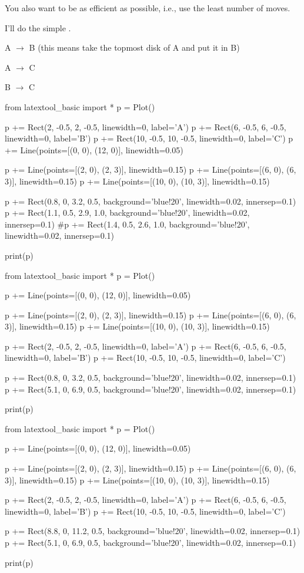  You also want to be as efficient as possible, i.e., use the least number
 of moves.

 I'll do the simple .

 A $\rightarrow$ B (this means take the topmost disk of A and put it in B)

 A $\rightarrow$ C

 B $\rightarrow$ C

\begin{python}
from latextool_basic import *
p = Plot()

p += Rect(2, -0.5, 2, -0.5, linewidth=0, label='A')
p += Rect(6, -0.5, 6, -0.5, linewidth=0, label='B')
p += Rect(10, -0.5, 10, -0.5, linewidth=0, label='C')
p += Line(points=[(0, 0), (12, 0)], linewidth=0.05)

p += Line(points=[(2, 0), (2, 3)], linewidth=0.15)
p += Line(points=[(6, 0), (6, 3)], linewidth=0.15)
p += Line(points=[(10, 0), (10, 3)], linewidth=0.15)

p += Rect(0.8, 0, 3.2, 0.5, background='blue!20', linewidth=0.02, innersep=0.1)  
p += Rect(1.1, 0.5, 2.9, 1.0, background='blue!20', linewidth=0.02, innersep=0.1)
#p += Rect(1.4, 0.5, 2.6, 1.0, background='blue!20', linewidth=0.02, innersep=0.1)

print(p)
\end{python}

\begin{python}
from latextool_basic import *
p = Plot()

p += Line(points=[(0, 0), (12, 0)], linewidth=0.05)

p += Line(points=[(2, 0), (2, 3)], linewidth=0.15)
p += Line(points=[(6, 0), (6, 3)], linewidth=0.15)
p += Line(points=[(10, 0), (10, 3)], linewidth=0.15)

p += Rect(2, -0.5, 2, -0.5, linewidth=0, label='A')
p += Rect(6, -0.5, 6, -0.5, linewidth=0, label='B')
p += Rect(10, -0.5, 10, -0.5, linewidth=0, label='C')

p += Rect(0.8, 0, 3.2, 0.5, background='blue!20', linewidth=0.02, innersep=0.1)  
p += Rect(5.1, 0, 6.9, 0.5, background='blue!20', linewidth=0.02, innersep=0.1)

print(p)
\end{python}

\begin{python}
from latextool_basic import *
p = Plot()

p += Line(points=[(0, 0), (12, 0)], linewidth=0.05)

p += Line(points=[(2, 0), (2, 3)], linewidth=0.15)
p += Line(points=[(6, 0), (6, 3)], linewidth=0.15)
p += Line(points=[(10, 0), (10, 3)], linewidth=0.15)

p += Rect(2, -0.5, 2, -0.5, linewidth=0, label='A')
p += Rect(6, -0.5, 6, -0.5, linewidth=0, label='B')
p += Rect(10, -0.5, 10, -0.5, linewidth=0, label='C')

p += Rect(8.8, 0, 11.2, 0.5, background='blue!20', linewidth=0.02, innersep=0.1)  
p += Rect(5.1, 0, 6.9, 0.5, background='blue!20', linewidth=0.02, innersep=0.1)

print(p)
\end{python}

